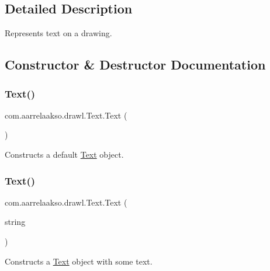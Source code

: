\subsection{Detailed Description}
Represents text on a drawing. 

\subsection{Constructor \& Destructor Documentation}
\mbox{\label{classcom_1_1aarrelaakso_1_1drawl_1_1_text_a9d9bdd3df91ff551c7bf96f741cde0e9}} 
\subsubsection{\texorpdfstring{Text()}{Text()}\hspace{0.1cm}{\footnotesize\ttfamily [1/2]}}
{\footnotesize\ttfamily com.\+aarrelaakso.\+drawl.\+Text.\+Text (\begin{DoxyParamCaption}{ }\end{DoxyParamCaption})}



Constructs a default \hyperlink{classcom_1_1aarrelaakso_1_1drawl_1_1_text}{Text} object. 

\mbox{\label{classcom_1_1aarrelaakso_1_1drawl_1_1_text_a5ed8ace51c474771273958290af944de}} 
\subsubsection{\texorpdfstring{Text()}{Text()}\hspace{0.1cm}{\footnotesize\ttfamily [2/2]}}
{\footnotesize\ttfamily com.\+aarrelaakso.\+drawl.\+Text.\+Text (\begin{DoxyParamCaption}\item[{@Not\+Null String}]{string }\end{DoxyParamCaption})}



Constructs a \hyperlink{classcom_1_1aarrelaakso_1_1drawl_1_1_text}{Text} object with some text. 


